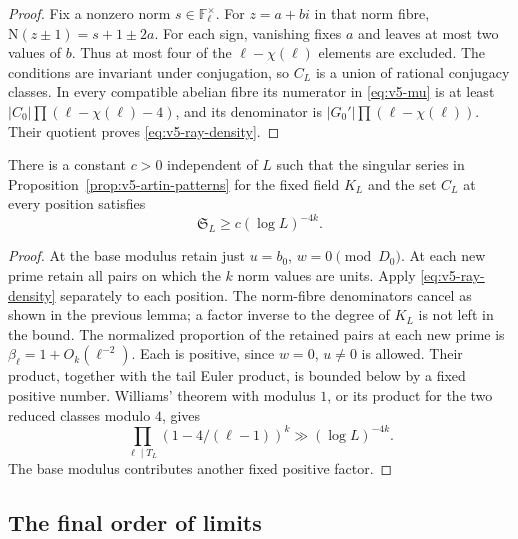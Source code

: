 \begin{proof}
Fix a nonzero norm $s\in\mathbb F_\ell^\times$.
For $z=a+bi$ in that norm fibre,
$\mathrm N(z\pm1)=s+1\pm2a$.
For each sign, vanishing fixes $a$ and leaves at most two values of $b$.
Thus at most four of the $\ell-\chi(\ell)$ elements are excluded.
The conditions are invariant under conjugation, so $C_L$ is a union of
rational conjugacy classes.
In every compatible abelian fibre its numerator in \eqref{eq:v5-mu} is
at least $|C_0|\prod(\ell-\chi(\ell)-4)$, and its denominator is
$|G_0'|\prod(\ell-\chi(\ell))$.
Their quotient proves \eqref{eq:v5-ray-density}.
\end{proof}

\begin{proposition}\label{prop:v5-cutoff-lower}
There is a constant $c>0$ independent of $L$ such that the singular series
in Proposition~\ref{prop:v5-artin-patterns} for the fixed field $K_L$ and
the set $C_L$ at every position satisfies
\[
 \mathfrak S_L\geq c(\log L)^{-4k}.
\]
\end{proposition}
\begin{proof}
At the base modulus retain just $u=b_0$, $w=0\pmod{D_0}$.
At each new prime retain all pairs on which the $k$ norm values are units.
Apply \eqref{eq:v5-ray-density} separately to each position.
The norm-fibre denominators cancel as shown in the previous lemma; a
factor inverse to the degree of $K_L$ is not left in the bound.
The normalized proportion of the retained pairs at each new prime is
$\beta_\ell=1+O_k(\ell^{-2})$. Each is positive, since $w=0$, $u\ne0$
is allowed. Their product, together with the tail Euler product, is
bounded below by a fixed positive number. Williams' theorem with modulus
$1$, or its product for the two reduced classes modulo $4$, gives
\[
 \prod_{\ell\mid T_L}(1-4/(\ell-1))^k
       \gg(\log L)^{-4k}.
\]
The base modulus contributes another fixed positive factor.
\end{proof}

\subsection{The final order of limits}\label{subsec:v5-diagonal}

